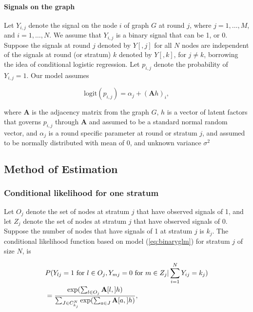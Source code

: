 \documentclass[
]{article}
\begin{document}
\hypertarget{signals-on-the-graph}{%
\paragraph{Signals on the graph}\label{signals-on-the-graph}}

Let \(Y_{i,j}\) denote the signal on the node \(i\) of graph \(G\) at
round \(j\), where \(j = 1, \dots, M\), and \(i = 1, \dots, N\). We
assume that \(Y_{i,j}\) is a binary signal that can be 1, or 0. Suppose
the signals at round \(j\) denoted by \(Y[, j]\) for all \(N\) nodes are
independent of the signals at round (or stratum) \(k\) denoted by
\(Y[,k ]\), for \(j \neq k\), borrowing the idea of conditional logistic
regression. Let \(p_{i,j}\) denote the probability of \(Y_{i,j} = 1\).
Our model assumes

\begin{equation}
\label{eq:binaryglm}
\text{logit}(p_{i,j}) = \alpha_j + (\mathbf{A} h )_i,
\end{equation}

where \(\mathbf{A}\) is the adjacency matrix from the graph \(G\), \(h\)
is a vector of latent factors that governs \(p_{i, j}\) through
\(\mathbf{A}\) and assumed to be a standard normal random vector, and
\(\alpha_j\) is a round specific parameter at round or stratum \(j\),
and assumed to be normally distributed with mean of 0, and unknown
variance \(\sigma^2\)

\hypertarget{method-of-estimation}{%
\subsection{Method of Estimation}\label{method-of-estimation}}

\hypertarget{conditional-likelihood-for-one-stratum}{%
\subsubsection{Conditional likelihood for one
stratum}\label{conditional-likelihood-for-one-stratum}}

Let \(O_j\) denote the set of nodes at stratum \(j\) that have observed
signals of 1, and let \(Z_j\) denote the set of nodes at stratum \(j\)
that have observed signals of 0. Suppose the number of nodes that have
signals of 1 at stratum \(j\) is \(k_j\). The conditional likelihood
function based on model (\ref{eq:binaryglm}) for stratum \(j\) of size
\(N\), is

\begin{equation}
    \label{eq:stratumlikelihood}
    \begin{aligned}
    &   P(Y_{lj} = 1 \text{ for } l \in O_j, Y_{mj} = 0 \text{ for } m \in Z_j | \sum_{i=1}^N Y_{ij} = k_j) \\   
    & =  {\text{exp} (\sum_{l \in O_j}\mathbf{A}[l, ] h ) \over \sum_{J \in C_{k_j}^N} \text{exp} (\sum_{a \in J}\mathbf{A}[a, ] h ) },
    \end{aligned}
\end{equation}
\end{document}

